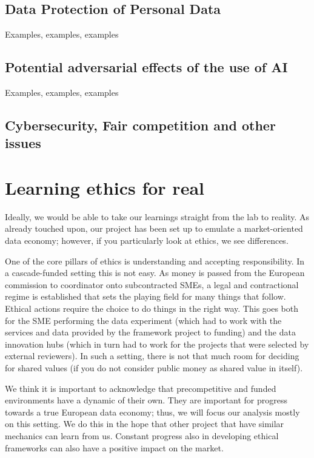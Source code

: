 \documentclass[	DIV=calc,%
							paper=a4,%
							fontsize=11pt,%
							twocolumn, draft]{scrartcl}	 					%
\begin{document}
\subsection{Data Protection of Personal Data}\label{}
Examples, examples, examples

\subsection{Potential adversarial effects of the use of AI}\label{}
Examples, examples, examples


\subsection{Cybersecurity, Fair competition and other issues}\label{}



\section{Learning ethics for real}\label{learning-ethics-for-real}

Ideally, we would be able to take our learnings straight from the lab to
reality. As already touched upon, our project has been set up to emulate
a market-oriented data economy; however, if you particularly look at
ethics, we see  differences.

One of the core pillars of ethics is understanding and accepting
responsibility. In a cascade-funded setting this is not easy. As money
is passed from the European commission to coordinator onto subcontracted
SMEs, a legal and contractional regime is established that sets the
playing field for many things that follow. Ethical actions require the
choice to do things in the right way. This goes both for the SME
performing the data experiment (which had to work with the services and
data provided by the framework project to funding) and the data
innovation hubs (which in turn had to work for the projects that were
selected by external reviewers). In such a setting, there is not that
much room for deciding for shared values (if you do not consider public
money as shared value in itself).

We think it is important to acknowledge that precompetitive and funded
environments have a dynamic of their own. They are important for
progress towards a true European data economy; thus, we will focus our
analysis mostly on this setting. We do this in the hope that other
project that have similar mechanics can learn from us. Constant progress
also in developing ethical frameworks can also have a positive impact on
the market.
\end{document}

